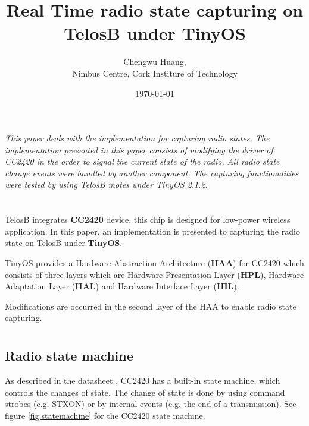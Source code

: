 \documentclass[a4paper,11pt]{article}
\title{Real Time radio state capturing on TelosB under TinyOS}
\author{Chengwu Huang, \\ Nimbus Centre, Cork Institure of Technology}
\date{\today}
\begin{document}
\maketitle
\tableofcontents

\newpage

\section*{}

\textit{This paper deals with the implementation for capturing radio states. The implementation presented in this paper consists of modifying the driver of CC2420 in the order to signal the current state of the radio. All radio state change events were handled by another component. The capturing functionalities were tested by using TelosB motes under TinyOS 2.1.2.}

\section{}

TelosB integrates \textbf{CC2420} device, this chip is designed for low-power wireless application. In this paper, an implementation is presented to capturing the radio state on TelosB under \textbf{TinyOS}.

TinyOS provides a Hardware Abstraction Architecture (\textbf{HAA}) for CC2420 which consists of three layers which are Hardware Presentation Layer (\textbf{HPL}), Hardware Adaptation Layer (\textbf{HAL}) and Hardware Interface Layer (\textbf{HIL}).

Modifications are occurred in the second layer of the HAA to enable radio state capturing.

\section{}

  \subsection{Radio state machine}

As described in the datasheet \cite{cc2420}, CC2420 has a built-in state machine, which controls the changes of state. The change of state is done by using command strobes (e.g. STXON) or by internal events (e.g. the end of a transmission). See figure \ref{fig:statemachine} for the CC2420 state machine.
\end{document}
